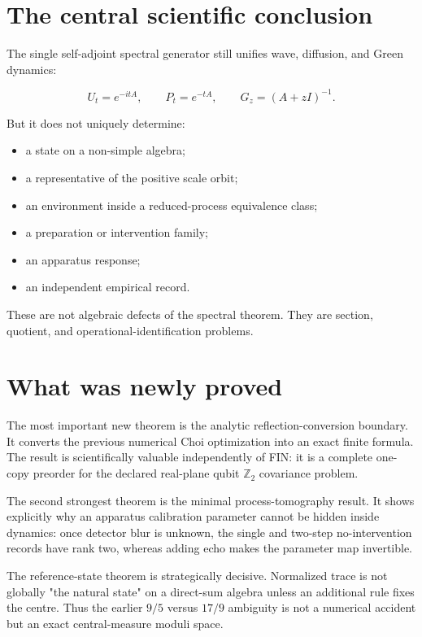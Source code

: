 \documentclass[11pt,a4paper,openany]{report}
\begin{document}
\section{The central scientific conclusion}

The single self-adjoint spectral generator still unifies wave, diffusion, and Green dynamics:

\[
U_t=e^{-itA},
\qquad
P_t=e^{-tA},
\qquad
G_z=(A+zI)^{-1}.
\]

But it does not uniquely determine:

\begin{itemize}
\item 
a state on a non-simple algebra;

\item 
a representative of the positive scale orbit;

\item 
an environment inside a reduced-process equivalence class;

\item 
a preparation or intervention family;

\item 
an apparatus response;

\item 
an independent empirical record.

\end{itemize}

These are not algebraic defects of the spectral theorem. They are section, quotient, and operational-identification problems.

\section{What was newly proved}

The most important new theorem is the analytic reflection-conversion boundary. It converts the previous numerical Choi optimization into an exact finite formula. The result is scientifically valuable independently of FIN: it is a complete one-copy preorder for the declared real-plane qubit \(\mathbb Z_2\) covariance problem.

The second strongest theorem is the minimal process-tomography result. It shows explicitly why an apparatus calibration parameter cannot be hidden inside dynamics: once detector blur is unknown, the single and two-step no-intervention records have rank two, whereas adding echo makes the parameter map invertible.

The reference-state theorem is strategically decisive. Normalized trace is not globally "the natural state" on a direct-sum algebra unless an additional rule fixes the centre. Thus the earlier \(9/5\) versus \(17/9\) ambiguity is not a numerical accident but an exact central-measure moduli space.
\end{document}
